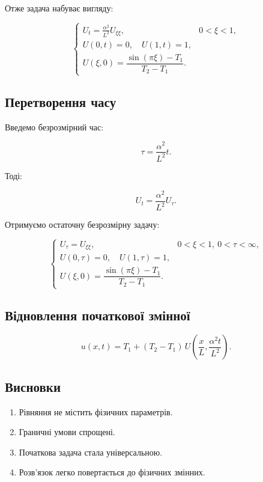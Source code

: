 \documentclass[
  ukrainian,
]{article}
\begin{document}
Отже задача набуває вигляду:

\[
\begin{cases}
U_t = \frac{\alpha^2}{L^2} U_{\xi\xi}, & 0 < \xi < 1, \\
U(0,t)=0,\quad U(1,t)=1, \\
U(\xi,0)=\dfrac{\sin(\pi \xi)-T_1}{T_2-T_1}.
\end{cases}
\]

\subsection{Перетворення
часу}\label{ux43fux435ux440ux435ux442ux432ux43eux440ux435ux43dux43dux44f-ux447ux430ux441ux443}

Введемо безрозмірний час:

\[
\tau = \frac{\alpha^2}{L^2} t.
\]

Тоді:

\[
U_t = \frac{\alpha^2}{L^2} U_\tau.
\]

Отримуємо остаточну безрозмірну задачу:

\[
\begin{cases}
U_\tau = U_{\xi\xi}, & 0 < \xi < 1,\ 0 < \tau < \infty, \\
U(0,\tau)=0,\quad U(1,\tau)=1, \\
U(\xi,0)=\dfrac{\sin(\pi \xi)-T_1}{T_2-T_1}.
\end{cases}
\]

\subsection{Відновлення початкової
змінної}\label{ux432ux456ux434ux43dux43eux432ux43bux435ux43dux43dux44f-ux43fux43eux447ux430ux442ux43aux43eux432ux43eux457-ux437ux43cux456ux43dux43dux43eux457}

\[
u(x,t) = T_1 + (T_2 - T_1)\, U\!\left(\frac{x}{L}, \frac{\alpha^2 t}{L^2}\right).
\]

\subsection{Висновки}\label{ux432ux438ux441ux43dux43eux432ux43aux438}

\begin{enumerate}
\def\labelenumi{\arabic{enumi}.}
\item
  Рівняння не містить фізичних параметрів.
\item
  Граничні умови спрощені.
\item
  Початкова задача стала універсальною.
\item
  Розв'язок легко повертається до фізичних змінних.
\end{enumerate}
\end{document}
